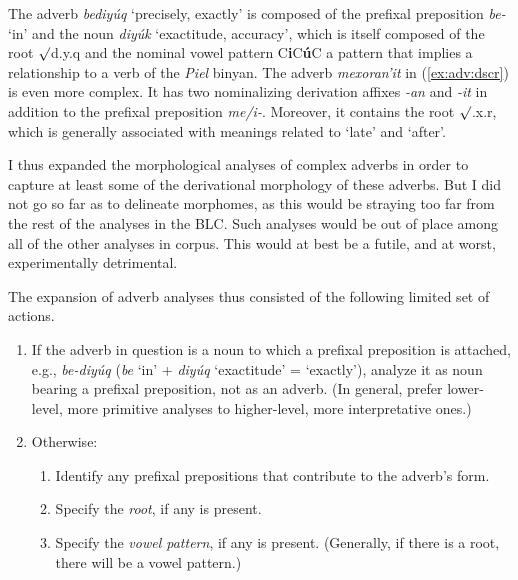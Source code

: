 The adverb \textit{bediy\'uq} `precisely, exactly'
is composed of the prefixal preposition \textit{be-} `in' and the 
noun \textit{diy\'uk} `exactitude, accuracy', which is itself composed of the 
root $\surd$d.y.q and the nominal vowel pattern C\textbf{i}C\textbf{\'u}C 
a pattern that implies a relationship to a verb of the \textit{Piel} binyan.  
The adverb \textit{\textsf{mexoran\a'{i}t}} in 
(\ref{ex:adv:dscr}) is even more complex. It has two nominalizing
derivation affixes \textit{\textsf{-an}} and \textit{\textsf{-it}} in addition 
to the prefixal preposition \textit{\textsf{me/i-}}. Moreover, it contains the 
root $\surd$\textsf{.x.r}, which is generally associated with meanings 
related to `late' and `after'.

I thus expanded the morphological analyses of complex adverbs in order to capture at 
least some of the derivational morphology of these adverbs.
But I did not go so far as to delineate morphomes, as this would 
be straying too far from the rest of the analyses in the BLC. Such 
analyses would be out of place among all of the other analyses in corpus. 
This would at best be a futile, and at worst, experimentally detrimental.

The expansion of adverb analyses thus consisted of the following limited set of actions. 
\begin{enumerate}
\item If the adverb in question is a noun to which a prefixal preposition is attached, e.g., \textit{be-diy\'uq} (\textit{be} `in' + \textit{diy\'uq} `exactitude' = `exactly'),  %
analyze it as noun bearing a prefixal preposition, not as an adverb. (In general, prefer lower-level, more primitive analyses to higher-level,
more interpretative ones.) 
\item Otherwise: %
    \begin{enumerate}
        \item Identify any prefixal prepositions that contribute to the adverb's form.
        \item Specify the \emph{root}, if any is present.
        \item Specify the \emph{vowel pattern}, if any is present. (Generally, if there is a root, there will be a vowel pattern.) 
    \end{enumerate}
\end{enumerate}


